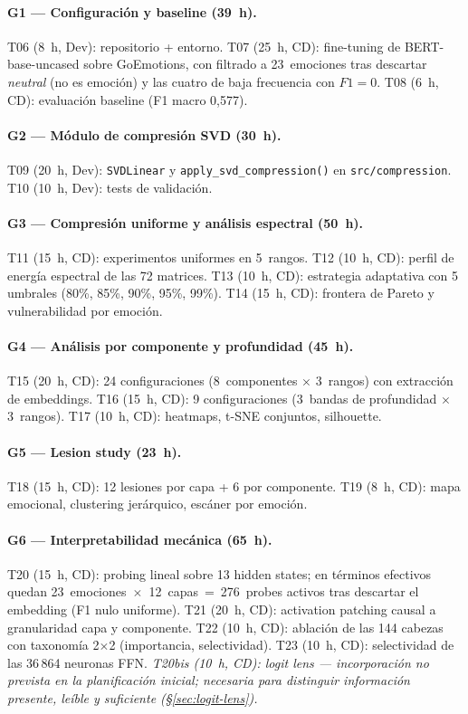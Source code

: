 \paragraph{G1 --- Configuración y baseline (39~h).}
T06 (8~h, Dev): repositorio + entorno. T07 (25~h, CD): fine-tuning de
BERT-base-uncased sobre GoEmotions, con filtrado a 23~emociones tras
descartar \emph{neutral} (no es emoción) y las cuatro de baja
frecuencia con $F1=0$. T08 (6~h, CD): evaluación baseline (F1 macro
0,577).

\paragraph{G2 --- Módulo de compresión SVD (30~h).}
T09 (20~h, Dev): \texttt{SVDLinear} y \texttt{apply\_svd\_compression()}
en \texttt{src/compression}. T10 (10~h, Dev): tests de validación.

\paragraph{G3 --- Compresión uniforme y análisis espectral (50~h).}
T11 (15~h, CD): experimentos uniformes en 5~rangos. T12 (10~h, CD):
perfil de energía espectral de las 72 matrices. T13 (10~h, CD):
estrategia adaptativa con 5 umbrales (80\%, 85\%, 90\%, 95\%, 99\%).
T14 (15~h, CD): frontera de Pareto y vulnerabilidad por emoción.

\paragraph{G4 --- Análisis por componente y profundidad (45~h).}
T15 (20~h, CD): 24 configuraciones (8~componentes $\times$ 3~rangos)
con extracción de embeddings. T16 (15~h, CD): 9 configuraciones
(3~bandas de profundidad $\times$ 3~rangos). T17 (10~h, CD): heatmaps,
t-SNE conjuntos, silhouette.

\paragraph{G5 --- Lesion study (23~h).}
T18 (15~h, CD): 12 lesiones por capa + 6 por componente. T19 (8~h, CD):
mapa emocional, clustering jerárquico, escáner por emoción.

\paragraph{G6 --- Interpretabilidad mecánica (65~h).}
T20 (15~h, CD): probing lineal sobre 13 hidden states; en términos
efectivos quedan 23~emociones~$\times$~12~capas~=~276~probes activos
tras descartar el embedding (F1 nulo uniforme). T21 (20~h, CD):
activation patching causal a granularidad capa y componente. T22
(10~h, CD): ablación de las 144 cabezas con taxonomía
2$\times$2 (importancia, selectividad). T23 (10~h, CD): selectividad de
las 36\,864 neuronas FFN. \emph{T20bis (10~h, CD): logit lens ---
incorporación no prevista en la planificación inicial; necesaria para
distinguir información presente, leíble y suficiente
(\S\ref{sec:logit-lens}).}

